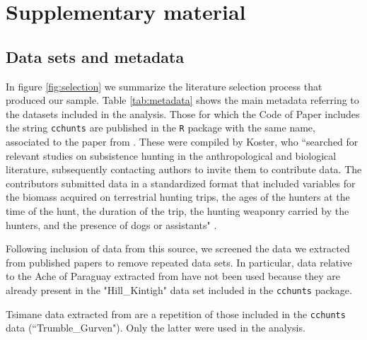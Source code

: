 \section{Supplementary material}
\subsection{Data sets and metadata}
In figure \ref{fig:selection} we summarize the literature selection process that produced our sample. Table \ref{tab:metadata} shows the main metadata referring to the datasets included in the analysis. Those for which the Code of Paper includes the string \texttt{cchunts} are published in the \texttt{R} package with the same name, associated to the paper from \citet{koster_life_2020}. These were compiled by Koster, who ``searched for relevant studies on subsistence hunting in the anthropological and biological literature, subsequently contacting authors to invite them to contribute data. The contributors submitted data in a standardized format that included variables for the biomass acquired on terrestrial hunting trips, the ages of the hunters at the time of the hunt, the duration of the trip, the hunting weaponry carried by the hunters, and the presence of dogs or assistants" \citep{koster_life_2020}.

Following inclusion of data from this source, we screened the data we extracted from published papers to remove repeated data sets. In particular, data relative to the Ache of Paraguay extracted from \citet{walker_age-dependency_2002} have not been used because they are already present in the "Hill\_Kintigh" data set included in the \texttt{cchunts} package. 

Tsimane data extracted from \citet{gurven_how_2006} are a repetition of those included in the \texttt{cchunts} data (``Trumble\_Gurven"). Only the latter were used in the analysis.


